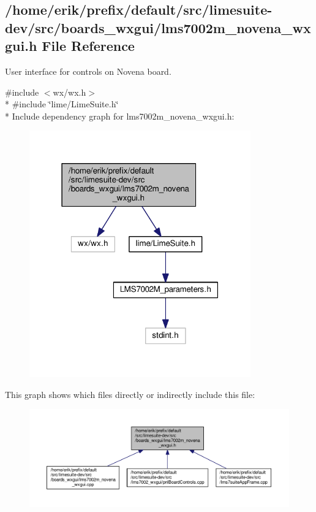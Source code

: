 \subsection{/home/erik/prefix/default/src/limesuite-\/dev/src/boards\+\_\+wxgui/lms7002m\+\_\+novena\+\_\+wxgui.h File Reference}
\label{lms7002m__novena__wxgui_8h}


User interface for controls on Novena board.  


{\ttfamily \#include $<$wx/wx.\+h$>$}\\*
{\ttfamily \#include \char`\"{}lime/\+Lime\+Suite.\+h\char`\"{}}\\*
Include dependency graph for lms7002m\+\_\+novena\+\_\+wxgui.\+h\+:
\nopagebreak
\begin{figure}[H]
\begin{center}
\leavevmode
\includegraphics[width=271pt]{db/dd3/lms7002m__novena__wxgui_8h__incl}
\end{center}
\end{figure}
This graph shows which files directly or indirectly include this file\+:
\nopagebreak
\begin{figure}[H]
\begin{center}
\leavevmode
\includegraphics[width=350pt]{d5/d80/lms7002m__novena__wxgui_8h__dep__incl}
\end{center}
\end{figure}
